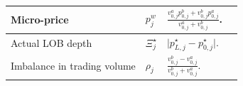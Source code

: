 \documentclass[10pt,a4paper,oneside]{article}
\begin{document}
\begin{longtable}{|p{4cm}|p{2.25cm}|p{5.25cm}|p{2.25cm}|}
    Micro-price                                                                                                                                                            &
    $p^w_j$                                                                                                                                                                &
    $\frac{v^a_{0, j} p^b_{0, j} + v^b_{0, j} p^a_{0, j}}{v^a_{0, j} + v^b_{0, j}}$.                                                                                       &
    \cite{gatheral2010zero}                                                                                                                                                                                                                                                                                                                                                                    \\ \hline


    Actual LOB depth                                                                                                                                                       &
    $\Xi^{\star}_j$                                                                                                                                                        &
    $\big| p^{\star}_{L, j} - p^{\star}_{0, j} \big|$.                                                                                                                     &
    \cite{briola2024deep}                                                                                                                                                                                                                                                                                                                                                                      \\ \hline

    Imbalance in trading volume                                                                                                                                            &
    $\rho_j$                                                                                                                                                               &
    $\frac{v^b_{0, j} - v^a_{0, j}}{v^b_{0, j} + v^a_{0, j}}$.                                                                                                             &
    \cite{cartea2018enhancing}                                                                                                                                                                                                                                                                                                                                                                 \\ \hline


\end{longtable}
\end{document}
